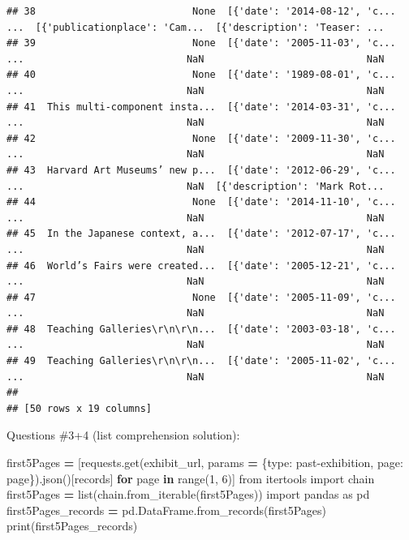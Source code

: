 \documentclass[
]{book}
\newenvironment{Shaded}{\begin{snugshade}}{\end{snugshade}}
\newcommand{\BuiltInTok}[1]{#1}
\newcommand{\ControlFlowTok}[1]{\textcolor[rgb]{0.13,0.29,0.53}{\textbf{#1}}}
\newcommand{\DecValTok}[1]{\textcolor[rgb]{0.00,0.00,0.81}{#1}}
\newcommand{\ImportTok}[1]{#1}
\newcommand{\KeywordTok}[1]{\textcolor[rgb]{0.13,0.29,0.53}{\textbf{#1}}}
\newcommand{\NormalTok}[1]{#1}
\newcommand{\OperatorTok}[1]{\textcolor[rgb]{0.81,0.36,0.00}{\textbf{#1}}}
\newcommand{\StringTok}[1]{\textcolor[rgb]{0.31,0.60,0.02}{#1}}
\begin{document}
\begin{verbatim}
## 38                           None  [{'date': '2014-08-12', 'c...  ...  [{'publicationplace': 'Cam...  [{'description': 'Teaser: ...
## 39                           None  [{'date': '2005-11-03', 'c...  ...                            NaN                            NaN
## 40                           None  [{'date': '1989-08-01', 'c...  ...                            NaN                            NaN
## 41  This multi-component insta...  [{'date': '2014-03-31', 'c...  ...                            NaN                            NaN
## 42                           None  [{'date': '2009-11-30', 'c...  ...                            NaN                            NaN
## 43  Harvard Art Museums’ new p...  [{'date': '2012-06-29', 'c...  ...                            NaN  [{'description': 'Mark Rot...
## 44                           None  [{'date': '2014-11-10', 'c...  ...                            NaN                            NaN
## 45  In the Japanese context, a...  [{'date': '2012-07-17', 'c...  ...                            NaN                            NaN
## 46  World’s Fairs were created...  [{'date': '2005-12-21', 'c...  ...                            NaN                            NaN
## 47                           None  [{'date': '2005-11-09', 'c...  ...                            NaN                            NaN
## 48  Teaching Galleries\r\n\r\n...  [{'date': '2003-03-18', 'c...  ...                            NaN                            NaN
## 49  Teaching Galleries\r\n\r\n...  [{'date': '2005-11-02', 'c...  ...                            NaN                            NaN
## 
## [50 rows x 19 columns]
\end{verbatim}

Questions \#3+4 (list comprehension solution):

\begin{Shaded}
\begin{Highlighting}[]
\NormalTok{first5Pages }\OperatorTok{=}\NormalTok{ [requests.get(exhibit\_url, params }\OperatorTok{=}\NormalTok{ \{}\StringTok{\textquotesingle{}type\textquotesingle{}}\NormalTok{: }\StringTok{\textquotesingle{}past{-}exhibition\textquotesingle{}}\NormalTok{, }\StringTok{\textquotesingle{}page\textquotesingle{}}\NormalTok{: page\}).json()[}\StringTok{\textquotesingle{}records\textquotesingle{}}\NormalTok{] }\ControlFlowTok{for}\NormalTok{ page }\KeywordTok{in} \BuiltInTok{range}\NormalTok{(}\DecValTok{1}\NormalTok{, }\DecValTok{6}\NormalTok{)]}
\ImportTok{from}\NormalTok{ itertools }\ImportTok{import}\NormalTok{ chain}
\NormalTok{first5Pages }\OperatorTok{=} \BuiltInTok{list}\NormalTok{(chain.from\_iterable(first5Pages))}
\ImportTok{import}\NormalTok{ pandas }\ImportTok{as}\NormalTok{ pd}
\NormalTok{first5Pages\_records }\OperatorTok{=}\NormalTok{ pd.DataFrame.from\_records(first5Pages)}
\BuiltInTok{print}\NormalTok{(first5Pages\_records)}
\end{Highlighting}
\end{Shaded}
\end{document}
